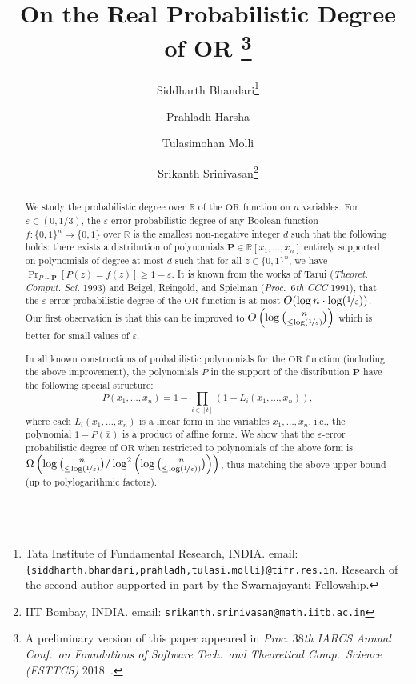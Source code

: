 \documentclass[10pt,a4paper]{article}
\title{On the Real Probabilistic Degree of OR \thanks{A
    preliminary version of this paper appeared in {\em Proc. $38$th IARCS Annual Conf.\ on Foundations of Software Tech.\ and
  Theoretical Comp.\ Science (FSTTCS)} 2018~\cite{BhandariHMS2018}.}}
\author{
  Siddharth Bhandari\thanks{Tata Institute of Fundamental Research,
    INDIA. email: {\tt
      \{siddharth.bhandari,prahladh,tulasi.molli\}@tifr.res.in}. Research
  of the second author supported in part by the Swarnajayanti Fellowship.}
  \and Prahladh Harsha\samethanks 
  \and Tulasimohan Molli\samethanks 
  \and Srikanth Srinivasan\thanks{IIT Bombay, INDIA. email: {\tt srikanth.srinivasan@math.iitb.ac.in}}}
\date{}
\theoremstyle{plain}
\theoremstyle{definition}
\renewcommand{\epsilon}{\varepsilon}
\newcommand{\eps}{\epsilon}
\newcommand{\zo}{\{0,1\}}
\newcommand{\OR}{\mathrm{OR}}
\newcommand{\reals}{\mathbb{R}}
\newcommand{\distP}{\mathbf{P}}
\newcommand{\bigo}[1]{O\left(#1\right)}
\newcommand{\lepsinv}{\log(\nicefrac1\eps)}
\begin{document}
\maketitle
\begin{abstract}
We study the probabilistic degree over $\reals$ of the $\OR$ function
on $n$ variables. For $\eps \in (0,1/3)$, the $\eps$-error probabilistic degree of 
any Boolean function $f:\zo^n\to \zo$ over $\reals$ is the smallest non-negative
integer $d$ such that the following holds: there exists
a distribution of polynomials $\distP \in \reals[x_1,\ldots,x_n]$ entirely
supported on polynomials of degree at most $d$ such that for all $z
\in \zo^n$, we have $\Pr_{P \sim \distP}[P(z) = f(z) ] \geq 1- \eps$.  It is
known from the works of Tarui ({\em Theoret. Comput. Sci.} 1993) and
Beigel, Reingold, and Spielman ({\em Proc.\ $6$th CCC} 1991), that the
$\eps$-error probabilistic
degree of the $\OR$ function is at most $O(\log n \cdot \lepsinv)$.  Our first observation
is that this can be improved to $\bigo{\log {\genfrac{(}{)}{0pt}{}{n}{\leq \lepsinv}}}$ 
which is better for small values of $\eps$. 

In all known constructions of probabilistic polynomials for the $\OR$
function (including the above improvement), the polynomials $P$ in the
support of the distribution $\distP$ have the
following special structure:
\[ 
P(x_1,\dots,x_n) = 1 - \prod_{i \in [t]} \left(1- L_i(x_1,\dots,x_n)\right),
\]
where each $L_i(x_1,\dots, x_n)$ is a linear form in the variables
$x_1,\ldots,x_n$, i.e., the polynomial $1-P(\bar{x})$ is a product of affine
forms. We show that the $\eps$-error probabilistic degree of
$\OR$ when restricted to polynomials of the above form 
is $\Omega\left( \log\binom{n}{\leq \lepsinv}/\log^2 \left( \log
\binom{n}{\leq \lepsinv)}\right)\right)$, thus matching the above upper bound 
(up to polylogarithmic factors).
\end{abstract}

\end{document}

